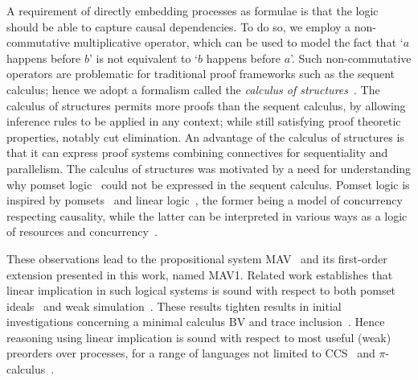 \documentclass[UKenglish,acmsmall,authorversion]{acmart}
\theoremstyle{plain}
\begin{document}
A requirement of directly embedding processes as formulae is that the logic should be able to capture causal dependencies.
To do so, we employ a non-commutative multiplicative operator, which can be used to model the fact that `$a$ happens before $b$' is not equivalent to `$b$ happens before $a$'.
Such non-commutative operators are problematic for traditional proof frameworks such as the sequent calculus;
hence we adopt a formalism called the \textit{calculus of structures}~\cite{Guglielmi2007,Tiu2006,Guglielmi2011,Strassburger2011,Strassburger2003thesis}.
The calculus of structures permits more proofs than the sequent calculus, by allowing inference rules to be applied in any context; while still satisfying proof theoretic properties, notably cut elimination.
An advantage of the calculus of structures is that it can express proof systems combining connectives for sequentiality and parallelism.
%
The calculus of structures was motivated by a need for understanding
why pomset logic~\cite{Retore1997} could not be expressed in the
sequent calculus. Pomset logic is inspired by
pomsets~\cite{Pratt1986} and linear logic~\cite{Girard1987}, the
former being a model of concurrency respecting
causality, while the latter can be interpreted in
various ways as a logic of resources and
concurrency~\cite{Caires2010,Kobayashi1993,Wadler2014}.


These observations lead to the propositional system \textsf{MAV}~\cite{Horne2015} and its first-order extension presented in this work, named \textsf{MAV1}.
Related work establishes that linear implication in such logical systems is sound with respect to both pomset ideals~\cite{Horne2017}
and weak simulation~\cite{MSCS}.
These results tighten results in initial investigations concerning a minimal calculus \textsf{BV} and trace inclusion~\cite{Bruscoli2002}.
Hence reasoning using linear implication is sound with respect to most useful (weak) preorders over processes,
for a range of languages not limited to \textsf{CCS}~\cite{Milner1982} and $\pi$-calculus~\cite{Milner1992}.
\end{document}
